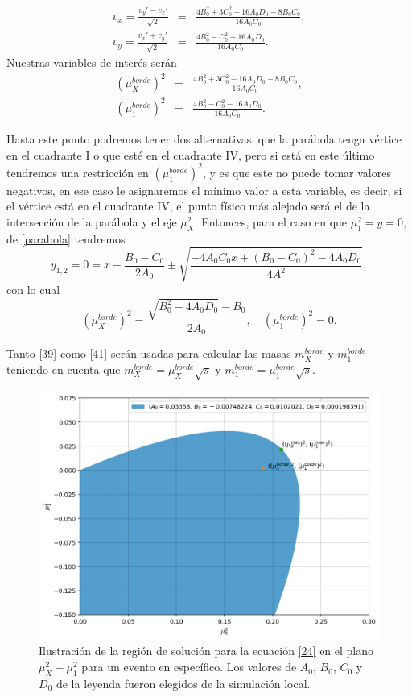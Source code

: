 \begin{eqnarray}
    v_x=\frac{v_y'-v_x'}{\sqrt{2}}&=&\frac{4B_0^2+3C_0^2-16A_0D_0-8B_0C_0}{16A_0C_0},\label{37}\\
    v_y=\frac{v_x'+v_y'}{\sqrt{2}}&=&\frac{4B_0^2-C_0^2-16A_0D_0}{16A_0C_0}\label{38}.
\end{eqnarray}
Nuestras variables de interés serán
\begin{eqnarray}
    (\mu^{borde}_X)^2&=&\frac{4B_0^2+3C_0^2-16A_0D_0-8B_0C_0}{16A_0C_0},\nonumber\\
    (\mu^{borde}_1)^2&=&\frac{4B_0^2-C_0^2-16A_0D_0}{16A_0C_0}\label{39}.
\end{eqnarray}

Hasta este punto podremos tener dos alternativas, que la parábola tenga vértice en el cuadrante I o que esté en el cuadrante IV, pero si está en este último tendremos una restricción en \((\mu^{borde}_1)^2\), y es que este no puede tomar valores negativos, en ese caso le asignaremos el mínimo valor a esta variable, es decir, si el vértice está en el cuadrante IV, el punto físico más alejado será el de la intersección de la parábola y el eje \(\mu_{X}^2\).
Entonces, para el caso en que \(\mu^2_1=y=0\), de \ref{parabola} tendremos
\begin{equation}
    y_{1,2}=0=x+\frac{B_0-C_0}{2A_0}\pm \sqrt{\frac{-4A_0C_0x+(B_0-C_0)^2-4A_0D_0}{4A^2}},\label{40}
\end{equation}
con lo cual
\begin{equation}
    (\mu^{borde}_X)^2=\frac{\sqrt{B_0^2-4A_0D_0}-B_0}{2A_0}, \quad (\mu^{borde}_1)^2 = 0.\label{41}
\end{equation}

Tanto \ref{39} como \ref{41} serán usadas para calcular las masas \(m^{borde}_X\) y \(m^{borde}_1\) teniendo en cuenta que \(m_X^{borde}=\mu^{borde}_X\sqrt{s}\) y \(m_1^{borde}=\mu^{borde}_1\sqrt{s}\).
\begin{figure}[h]
    \centering
    \includegraphics[scale=.5]{Images/parabola_Mmax.png}
    \caption{\small Ilustración de la región de solución para la ecuación \ref{24} en el plano \(\mu^2_X-\mu^2_1\) para un evento en específico. Los valores de \(A_0\), \(B_0\), \(C_0\) y \(D_0\) de la leyenda fueron elegidos de la simulación local.}
    \label{fig:parab}
\end{figure}

